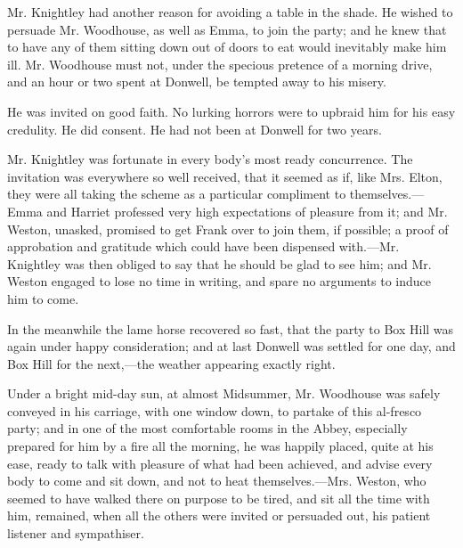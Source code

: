 Mr. Knightley had another reason for avoiding a table in the shade. He wished to persuade Mr. Woodhouse, as well as Emma, to join the party; and he knew that to have any of them sitting down out of doors to eat would inevitably make him ill. Mr. Woodhouse must not, under the specious pretence of a morning drive, and an hour or two spent at Donwell, be tempted away to his misery.

He was invited on good faith. No lurking horrors were to upbraid him for his easy credulity. He did consent. He had not been at Donwell for two years. 

Mr. Knightley was fortunate in every body's most ready concurrence. The invitation was everywhere so well received, that it seemed as if, like Mrs. Elton, they were all taking the scheme as a particular compliment to themselves.---Emma and Harriet professed very high expectations of pleasure from it; and Mr. Weston, unasked, promised to get Frank over to join them, if possible; a proof of approbation and gratitude which could have been dispensed with.---Mr. Knightley was then obliged to say that he should be glad to see him; and Mr. Weston engaged to lose no time in writing, and spare no arguments to induce him to come.

In the meanwhile the lame horse recovered so fast, that the party to Box Hill was again under happy consideration; and at last Donwell was settled for one day, and Box Hill for the next,---the weather appearing exactly right.

Under a bright mid-day sun, at almost Midsummer, Mr. Woodhouse was safely conveyed in his carriage, with one window down, to partake of this al-fresco party; and in one of the most comfortable rooms in the Abbey, especially prepared for him by a fire all the morning, he was happily placed, quite at his ease, ready to talk with pleasure of what had been achieved, and advise every body to come and sit down, and not to heat themselves.---Mrs. Weston, who seemed to have walked there on purpose to be tired, and sit all the time with him, remained, when all the others were invited or persuaded out, his patient listener and sympathiser.

